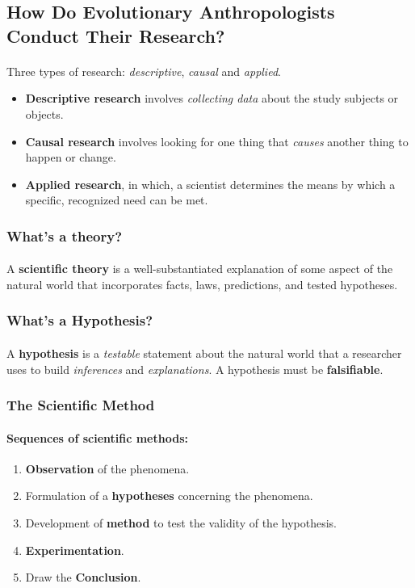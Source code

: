 \documentclass{article}
\begin{document}
	\subsection{How Do Evolutionary Anthropologists Conduct Their Research?}
	\paragraph{}Three types of research: \emph{descriptive}, \emph{causal} and \emph{applied}.
	\begin{itemize}
		\item \textbf{Descriptive research} involves \emph{collecting data} about the study subjects or objects.
		\item \textbf{Causal research} involves looking for one thing that \emph{causes} another thing to happen or change.
		\item \textbf{Applied research}, in which, a scientist determines the means by which a specific, recognized need can be met.
	\end{itemize}
	\subsubsection{What's a theory?}
	\paragraph{}A \textbf{scientific theory} is a well-substantiated explanation of some aspect of the natural world that incorporates facts, laws, predictions, and tested hypotheses.
	\subsubsection{What's a Hypothesis?}
	\paragraph{}A \textbf{hypothesis} is a \emph{testable} statement about the natural world that a researcher uses to build \emph{inferences} and \emph{explanations}. A hypothesis must be \textbf{falsifiable}.
	\subsubsection{The Scientific Method}
	\paragraph{Sequences of scientific methods:}
	\begin{enumerate}
		\item \textbf{Observation} of the phenomena.
		\item Formulation of a \textbf{hypotheses} concerning the phenomena.
		\item Development of \textbf{method} to test the validity of the hypothesis.
		\item \textbf{Experimentation}.
		\item Draw the \textbf{Conclusion}.
	\end{enumerate}
\end{document}
